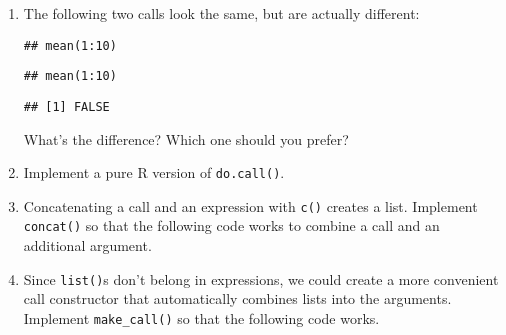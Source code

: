 \begin{enumerate}
\def\labelenumi{\arabic{enumi}.}
\item
  The following two calls look the same, but are actually different:

\begin{Shaded}
\begin{Highlighting}[]
\StringTok{ }\NormalTok{(}\NormalTok{, }\OperatorTok{:}\NormalTok{))}
\end{Highlighting}
\end{Shaded}

\begin{verbatim}
## mean(1:10)
\end{verbatim}

\begin{Shaded}
\begin{Highlighting}[]
\StringTok{ }\NormalTok{(}\NormalTok{, }\NormalTok{(}\OperatorTok{:}\NormalTok{)))}
\end{Highlighting}
\end{Shaded}

\begin{verbatim}
## mean(1:10)
\end{verbatim}

\begin{Shaded}
\begin{Highlighting}[]
\end{Highlighting}
\end{Shaded}

\begin{verbatim}
## [1] FALSE
\end{verbatim}

  What's the difference? Which one should you prefer?
\item
  Implement a pure R version of \texttt{do.call()}.
\item
  Concatenating a call and an expression with \texttt{c()} creates a
  list. Implement \texttt{concat()} so that the following code works to
  combine a call and an additional argument.

\begin{Shaded}
\begin{Highlighting}[]
\NormalTok{(} \NormalTok{, } \NormalTok{(}
\end{Highlighting}
\end{Shaded}
\item
  Since \texttt{list()}s don't belong in expressions, we could create a
  more convenient call constructor that automatically combines lists
  into the arguments. Implement \texttt{make\_call()} so that the
  following code works.


\end{enumerate}
